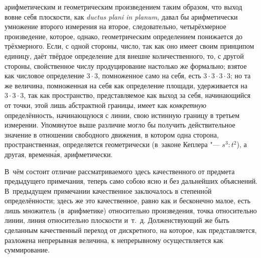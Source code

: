 арифметическим и геометрическим произведением таким образом, что выход вовне
себя плоскости, как {\em ductus plani in planum,} давал бы арифметически
умножение второго измерения на второе, следовательно, четырёхмерное
произведение, которое, однако, геометрическим определением понижается до
трёхмерного. Если, с одной стороны, число, так как оно имеет своим принципом
единицу, даёт твёрдое определение для внешне количественного, то, с другой
стороны, свойственное числу продуцирование настолько же формально; взятое как
числовое определение $3\cdot 3$, помноженное само на себя, есть
$3\cdot 3\cdot 3\cdot 3$; но та же величина, помноженная на себя как определение
площади, удерживается на $3\cdot 3\cdot 3$, так как пространство,
представляемое как выход за себя, начинающийся от точки, этой лишь абстрактной
границы, имеет как {\em конкретную} определённость, начинающуюся с линии, свою
истинную границу в третьем измерении. Упомянутое выше различие могло бы
получить действительное значение в отношении свободного движения, в котором
одна сторона, пространственная, определяется геометрически (в~законе Кеплера
"--- $s^3:t^2$), а другая, временн\'{а}я, арифметически.

В~чём состоит отличие рассматриваемого здесь качественного от предмета
предыдущего примечания, теперь само собою ясно и без дальнейших объяснений.
В~предыдущем примечании качественное заключалось в степенн\'{о}й
определённости; здесь же это качественное, равно как и бесконечно малое, есть
лишь множитель (в~арифметике) относительно произведения, точка относительно
линии, линия относительно плоскости и~т.~д. Долженствующий же быть сделанным
качественный переход от дискретного, на которое, как представляется, разложена
непрерывная величина, к непрерывному осуществляется как суммирование.

